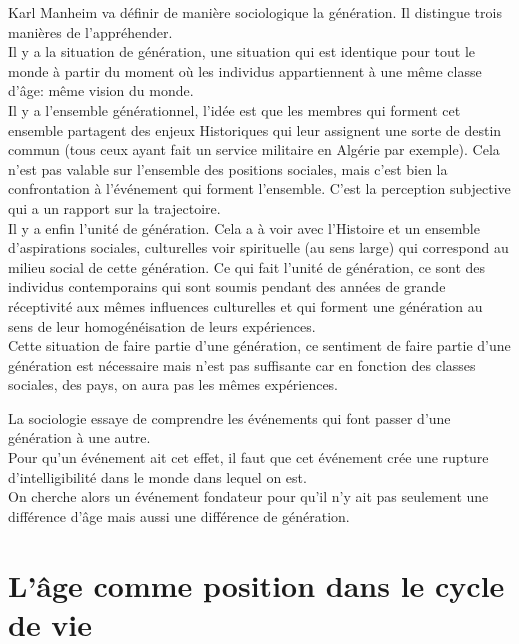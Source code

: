 \documentclass[12pt, a4paper, openany]{book}
\begin{document}
Karl Manheim va définir de manière sociologique la génération. Il distingue trois manières de l'appréhender. \\
Il y a la situation de génération, une situation qui est identique pour tout le monde à partir du moment où les individus appartiennent à une même classe d'âge: même vision du monde. \\
Il y a l'ensemble générationnel, l'idée est que les membres qui forment cet ensemble partagent des enjeux Historiques qui leur assignent une sorte de destin commun (tous ceux ayant fait un service militaire en Algérie par exemple). Cela n'est pas valable sur l'ensemble des positions sociales, mais c'est bien la confrontation à l'événement qui forment l'ensemble. C'est la perception subjective qui a un rapport sur la trajectoire. \\
Il y a enfin l'unité de génération. Cela a à voir avec l'Histoire et un ensemble d'aspirations sociales, culturelles voir spirituelle (au sens large) qui correspond au milieu social de cette génération. Ce qui fait l'unité de génération, ce sont des individus contemporains qui sont soumis pendant des années de grande réceptivité aux mêmes influences culturelles et qui forment une génération au sens de leur homogénéisation de leurs expériences. \\
Cette situation de faire partie d'une génération, ce sentiment de faire partie d'une génération est nécessaire mais n'est pas suffisante car en fonction des classes sociales, des pays, on aura pas les mêmes expériences. 


La sociologie essaye de comprendre les événements qui font passer d'une génération à une autre. \\
Pour qu'un événement ait cet effet, il faut que cet événement crée une rupture d'intelligibilité dans le monde dans lequel on est. \\
On cherche alors un événement fondateur pour qu'il n'y ait pas seulement une différence d'âge mais aussi une différence de génération. 

\section{L'âge comme position dans le cycle de vie}
\end{document}

